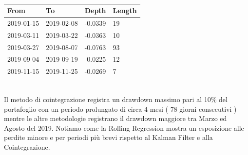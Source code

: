 \documentclass[]{article}
\begin{document}
\
\\
\begin{center}
\begin{tabular}{@{}llll@{}}
	\toprule
	From       & To         & Depth   & Length \\ \midrule
	2019-01-15 & 2019-02-08 & -0.0339 & 19     \\
	2019-03-11 & 2019-03-22 & -0.0363 & 10     \\
	\rowcolor[HTML]{FFCCC9} 
	2019-03-27 & 2019-08-07 & -0.0763 & 93     \\
	2019-09-04 & 2019-09-19 & -0.0225 & 12     \\
	2019-11-15 & 2019-11-25 & -0.0269 & 7      \\ \bottomrule
\end{tabular}
	\label{drawdowns_ucg_bpe_rl}
\end{center}
\
\\
Il metodo di cointegrazione registra un drawdown massimo pari al 10\% del portafoglio con un periodo prolungato di circa 4 mesi ( 78 giorni consecutivi ) mentre le altre metodologie registrano il drawdown maggiore tra Marzo ed Agosto del 2019.
Notiamo come la Rolling Regression mostra un esposizione alle perdite minore e per periodi più brevi rispetto al Kalman Filter e alla Cointegrazione.
\end{document}

